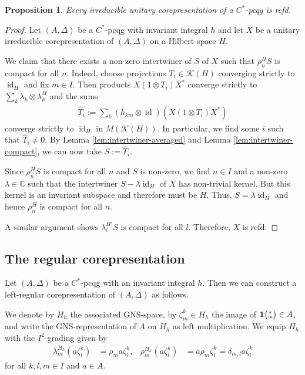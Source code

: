 \documentclass[11pt]{article}
\DeclareMathOperator{\id}{id}
\newcommand{\C}{\mathbb{C}}
\newcommand{\Grt}[3]{#1{\tiny {\begin{pmatrix} #2\\#3\end{pmatrix}}}}
\newcommand{\UnitC}[2]{\Grt{\mathbf{1}}{#1}{#2}}
\newtheorem{Prop}[Theorem]{Proposition}
\theoremstyle{definition}
\numberwithin{equation}{section}
\begin{document}
\begin{Prop} \label{prop:corep-rcfd}
Every irreducible unitary corepresentation of a  $C^{*}$-pcqg is rcfd.
\end{Prop}
\begin{proof}
  Let $(A,\Delta)$ be a $C^{*}$-pcqg with invariant integral $h$ and
  let $X$ be a unitary irreducible corepresentation of $(A,\Delta)$ on
  a Hilbert space $H$.

  We claim that there exists a non-zero intertwiner of $S$ of $X$ such
  that $\rho^{H}_{n}S$ is compact for all $n$.  Indeed, choose
  projections $T_{i} \in \mathcal{K}(H)$ converging strictly to
  $\id_{H}$ and fix $m\in I$. Then products $X(1\otimes T_{i})X^{*}$
  converge strictly to $\sum_{k} \lambda_{k} \otimes \lambda_{k}^{H}$
  and the sums
  \begin{align*}
    \hat T_{i} := \sum_{k}(h_{km} \otimes \id)(X(1\otimes T_{i})X^{*})
  \end{align*}
  converge strictly to $\id_{H}$ in $M(\mathcal{K}(H))$. In
  particular, we find some $i$ such that $\hat T_{i}\neq 0$.  By Lemma 
  \ref{lem:intertwiner-averaged} and  Lemma
  \ref{lem:intertwiner-compact}, we can now take $S:=\hat T_{i}$.

  Since $\rho^{H}_{n}S$ is compact for all $n$ and $S$ is non-zero, we
  find $n \in I$ and a non-zero $\lambda\in \C$ such that the
  intertwiner $S-\lambda\id_{H}$ of $X$ has non-trivial kernel.  But
  this kernel is an invariant subspace and therefore must be $H$.
  Thus, $S=\lambda\id_{H}$ and hence $\rho^{H}_{n}$ is compact for all
  $n$.


  A similar argument shows $\lambda^{H'}_{l}S$ is compact for all
  $l$. Therefore, $X$ is rcfd.
\end{proof}



\subsection{The regular corepresentation}
 Let $(A,\Delta)$ be a $C^{*}$-pcqg with an invariant integral $h$. 
 Then we can construct a left-regular corepresentation of $(A,\Delta)$ as follows.

 
 We denote by $H_{h}$ the associated GNS-space, by $\zeta^k_m \in H_{h}$ the image of $\UnitC{k}{m}
 \in A$, and write the GNS-representation of $A$ on $H_{h}$ as left multiplication.  We equip 
 $H_{h}$ with the $I^{2}$-grading given by
 \begin{align*}
   \lambda^{H_{h}}_{m}  (a\zeta^{k}_{l}) &=  \rho_{m}a \zeta^{k}_{l}, &
   \rho^{H_{h}}_{m} (a\zeta^{k}_{l}) &= a\rho_{m} \zeta^{k}_{l} = \delta_{m,l} a\zeta^{k}_{l}
 \end{align*}
 for all $k,l,m\in I$ and $a\in A$.
\end{document}
